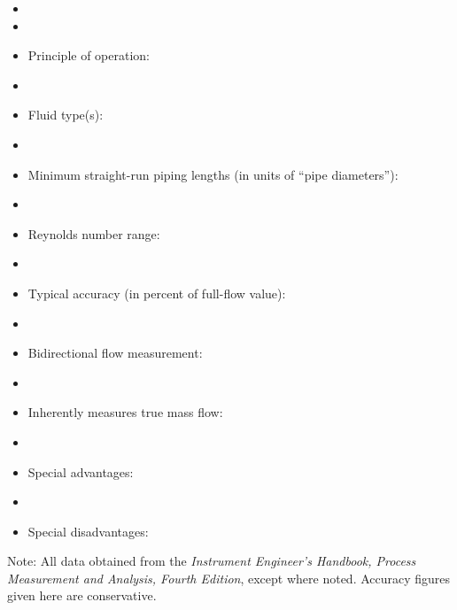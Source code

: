 \begin{itemize}
\goodbreak
\item{} 
\vskip 5pt
\item\item{} Principle of operation:
\vskip 5pt
\item\item{} Fluid type(s):
\vskip 5pt
\item\item{} Minimum straight-run piping lengths (in units of ``pipe diameters''):
\vskip 5pt
\item\item{} Reynolds number range:
\vskip 5pt
\item\item{} Typical accuracy (in percent of full-flow value):
\vskip 5pt
\item\item{} Bidirectional flow measurement:
\vskip 5pt
\item\item{} Inherently measures true mass flow:
\vskip 5pt
\item\item{} Special advantages:
\vskip 5pt
\item\item{} Special disadvantages:
\end{itemize}







Note: All data obtained from the {\it Instrument Engineer's Handbook, Process Measurement and Analysis, Fourth Edition}, except where noted.  Accuracy figures given here are conservative.


